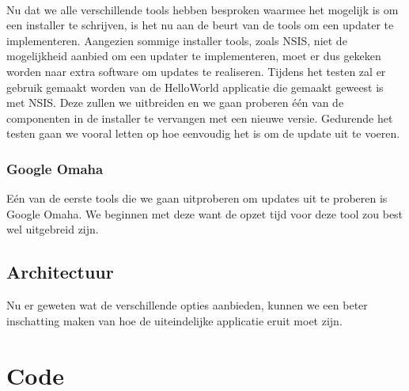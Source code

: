 \documentclass{article}
\begin{document}
\paragraph{}
Nu dat we alle verschillende tools hebben besproken waarmee het mogelijk is om een installer te schrijven, is het nu aan de beurt van de tools om een updater te implementeren.
Aangezien sommige installer tools, zoals NSIS, niet de mogelijkheid aanbied om een updater te implementeren, moet er dus gekeken worden naar extra software om updates te realiseren.
Tijdens het testen zal er gebruik gemaakt worden van de HelloWorld applicatie die gemaakt geweest is met NSIS.
Deze zullen we uitbreiden en we gaan proberen \'e\'en van de componenten in de installer te vervangen met een nieuwe versie.
Gedurende het testen gaan we vooral letten op hoe eenvoudig het is om de update uit te voeren.

\subsubsection{Google Omaha}
E\'en van de eerste tools die we gaan uitproberen om updates uit te proberen is Google Omaha.
We beginnen met deze want de opzet tijd voor deze tool zou best wel uitgebreid zijn.

\subsection{Architectuur}
Nu er geweten wat de verschillende opties aanbieden, kunnen we een beter inschatting maken van hoe de uiteindelijke applicatie eruit moet zijn.

\section{Code}\label{section:code}















%

\end{document}
